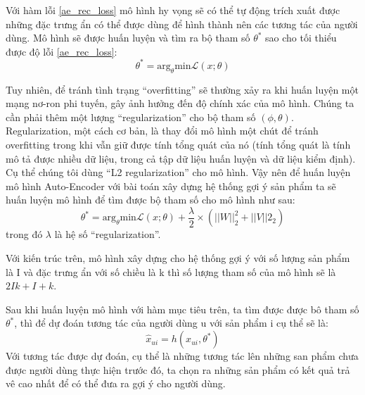     Với hàm lỗi \ref{ae_rec_loss} mô hình hy vọng sẽ có thể tự động trích xuất được những đặc trưng ẩn có thể được dùng để hình thành nên các tương tác của người dùng.
    Mô hình sẽ được huấn luyện và tìm ra bộ tham số $\theta^*$ sao cho tối thiểu được độ lỗi \ref{ae_rec_loss}: 
    \begin{equation}
        \theta^* = \text{arg}_\theta \text{min}  \mathcal{L}(x;\theta)
    \end{equation}    
    

    Tuy nhiên, để tránh tình trạng ``overfitting'' sẽ thường xảy ra khi huấn luyện một mạng nơ-ron phi tuyến, gây ảnh hưởng đến độ chính xác của mô hình. 
    Chúng ta cần phải thêm một lượng ``regularization'' cho bộ tham số $(\phi,\theta)$.
    Regularization, một cách cơ bản, là thay đổi mô hình một chút để tránh overfitting trong khi vẫn giữ được tính tổng quát của nó (tính tổng quát là tính mô tả được nhiều dữ liệu, trong cả tập dữ liệu huấn luyện và dữ liệu kiểm định).
    Cụ thể chúng tôi dùng ``L2 regularization'' cho mô hình.
    Vậy nên để huấn luyện mô hình Auto-Encoder với bài toán xây dựng hệ thống gợi ý sản phẩm ta sẽ huấn luyện mô hình để tìm được bộ tham số cho mô hình  như sau:
    \begin{equation}
        \label{ae_rec_obj}
        \theta^* = \text{arg}_\theta \text{min}  \mathcal{L}(x;\theta)  + \frac \lambda 2 \times (||W||^2_2 + ||V||2_2)
    \end{equation}
    trong đó $\lambda$ là hệ số ``regularization''.

    Với kiến trúc trên, mô hình xây dựng cho hệ thống gợi ý với số lượng sản phẩm là I và đặc trưng ẩn với số chiều là k thì số lượng tham số của mô hình sẽ là $2Ik + I + k$.
    
    Sau khi huấn luyện mô hình với hàm mục tiêu trên, ta tìm được được bô tham số $\theta^*$, thì để dự đoán tương tác của người dùng u với sản phẩm i cụ thể sẽ là: 
    $$\widehat{x}_{ui} = h(x_{ui},\theta^*)$$
    Với tương tác được dự đoán, cụ thể là những tương tác lên những san phẩm chưa được người dùng thực hiện trước đó, ta chọn ra những sản phẩm có kết quả trả vê cao nhất để có thể đưa ra gợi ý cho người dùng. 


